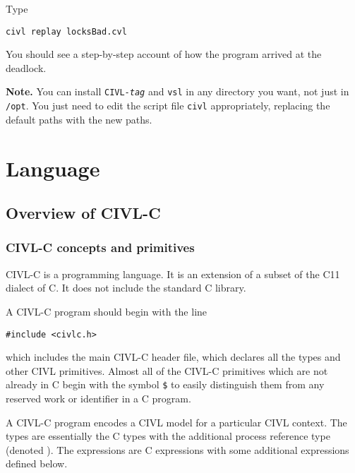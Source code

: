 \documentclass[11pt]{book}
\begin{document}
Type
\begin{verbatim}
civl replay locksBad.cvl
\end{verbatim}
You should see a step-by-step account of how the program arrived
at the deadlock.

\textbf{Note.}  You can install \texttt{CIVL-\textit{tag}} and
\texttt{vsl} in any directory you want, not just in \texttt{/opt}.
You just need to edit the script file \texttt{civl} appropriately,
replacing the default paths with the new paths.

\part{Language}

\chapter{Overview of CIVL-C}




\section{CIVL-C concepts and primitives}

CIVL-C is a programming language.  It is an extension of a subset of
the C11 dialect of C.  It does not include the standard C library.

A CIVL-C program should begin with the line
\begin{verbatim}
#include <civlc.h>
\end{verbatim}
which includes the main CIVL-C header file, which declares all the
types and other CIVL primitives.  Almost all of the CIVL-C primitives
which are not already in C begin with the symbol \texttt{\$} to easily
distinguish them from any reserved work or identifier in a C program.  

A CIVL-C program encodes a CIVL model for a particular CIVL
context. The types are essentially the C types with the additional
process reference type (denoted \cproc).  The expressions are C
expressions with some additional expressions defined below.
\end{document}
